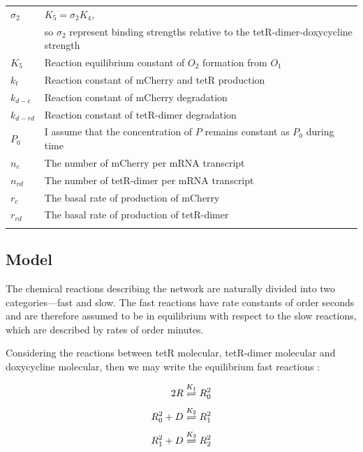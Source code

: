 \begin{table}[H]
\begin{tabular}{l l}
$\sigma_{2}$ & 
$K_{5} = \sigma_{2} K_{4}$, \\ &so $\sigma_{2}$ represent binding strengths relative to the tetR-dimer-doxycycline strength \\
$K_{5}$ & 
Reaction equilibrium constant of $O_{2}$ formation from $O_{1}$\\
$k_{t}$ & 
Reaction constant of mCherry and tetR production\\
$k_{d-c}$ & 
Reaction constant of mCherry degradation\\
$k_{d-rd}$ & 
Reaction constant of tetR-dimer degradation\\
$P_{0}$ & 
I assume that the concentration of $P$ remains constant as $P_{0}$ during time\\
$n_c$ & 
The number of mCherry per mRNA transcript\\
$n_{rd}$ & 
The number of tetR-dimer per mRNA transcript\\
$r_c$ & 
The basal rate of production of mCherry\\
$r_{rd}$ & 
The basal rate of production of tetR-dimer\\
\bottomrule\\
\end{tabular}
\end{table}
\newpage


\subsection{Model}
The chemical reactions describing the network are naturally divided into two categories—fast and slow. The fast reactions have rate constants of order seconds and are therefore assumed to be in equilibrium with respect to the slow reactions, which are described by rates of order minutes.

Considering the reactions between tetR molecular, tetR-dimer molecular and doxycycline molecular, then we may write the equilibrium fast reactions :

\begin{equation} 
\begin{aligned} 
\centering
2R         &\underset{}{\overset{K_1}{\rightleftharpoons}} R^2_0 \\ 
R^2_0 + D  &\underset{}{\overset{K_2}{\rightleftharpoons}} R^2_1 \\ 
R^2_1 + D  &\underset{}{\overset{K_3}{\rightleftharpoons}} R^2_2 \\  
\end{aligned} 
\end{equation}

